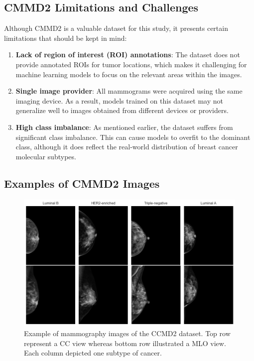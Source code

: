 \documentclass[a4paper,10pt]{book}
\begin{document}
\subsection{CMMD2 Limitations and Challenges}

Although CMMD2 is a valuable dataset for this study, it presents certain limitations that should be kept in mind:

\begin{enumerate}
    \item \textbf{Lack of region of interest (ROI) annotations}: The dataset does not provide annotated ROIs for tumor locations, which makes it challenging for machine learning models to focus on the relevant areas within the images.
    \item \textbf{Single image provider}: All mammograms were acquired using the same imaging device. As a result, models trained on this dataset may not generalize well to images obtained from different devices or providers.
    \item \textbf{High class imbalance}: As mentioned earlier, the dataset suffers from significant class imbalance. This can cause models to overfit to the dominant class, although it does reflect the real-world distribution of breast cancer molecular subtypes.
\end{enumerate}



\subsection{Examples of CMMD2 Images}

\begin{figure}[h!]
	\centering
	\includegraphics[width=1.0\linewidth]{reports//assets/images_examples.png}
	\caption[CMMD2 mammography images examples]{Example of mammography images of the CCMD2 dataset. Top row represent a CC view whereas bottom row illustrated a MLO view. Each column depicted one subtype of cancer.}
	\label{fig:cmmd-examples}
\end{figure}
\end{document}
